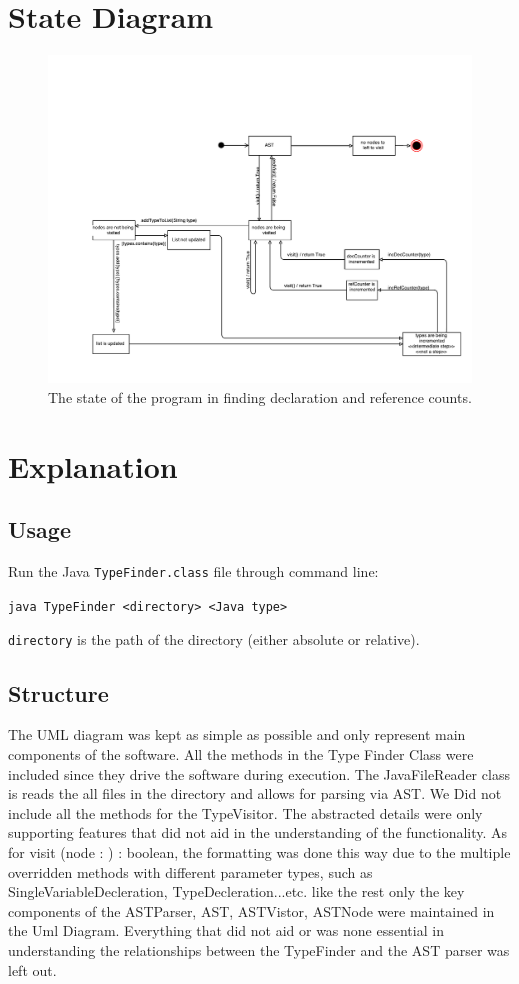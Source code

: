 \documentclass[12p]{article}
\newcommand{\code}[1]{\texttt{#1}}
\begin{document}
\newpage

\section{State Diagram}
\begin{figure}[H]
  \includegraphics[width=1.0\textwidth]{State_diagram.pdf}
  \caption{The state of the program in finding declaration and reference counts.} %
  \label{fig:state}
\end{figure}

\newpage
\section{Explanation}

\subsection{Usage}
Run the Java \code{TypeFinder.class} file through command line:

\code{java TypeFinder <directory> <Java type>}

\code{directory} is the path of the directory (either absolute or relative).

\subsection{Structure}
The UML diagram was kept as simple as possible and only represent main components of the software. All the methods in the Type Finder Class were included since they drive the software during execution. The JavaFileReader class is reads the all files in the directory and allows for parsing via AST. We Did not include all the methods for the TypeVisitor. The abstracted details were only supporting features that did not aid in the understanding of the functionality. As for visit (node : ) : boolean, the formatting was done this way due to the multiple overridden methods with different parameter types, such as SingleVariableDecleration, TypeDecleration...etc.
like the rest only the key components of the ASTParser, AST, ASTVistor, ASTNode were maintained in the Uml Diagram. Everything that did not aid or was none essential in understanding the relationships between the TypeFinder and the AST parser was left out.
\end{document}
